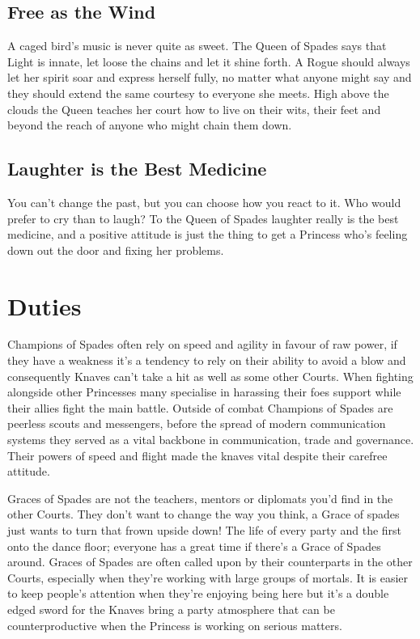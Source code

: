 \subsection*{Free as the Wind}

A caged bird's music is never quite as sweet. The Queen of Spades says that Light is innate, let loose the chains and let it shine forth. A Rogue should always let her spirit soar and express herself fully, no matter what anyone might say and they should extend the same courtesy to everyone she meets. High above the clouds the Queen teaches her court how to live on their wits, their feet and beyond the reach of anyone who might chain them down. 

\subsection*{Laughter is the Best Medicine}

You can't change the past, but you can choose how you react to it. Who would prefer to cry than to laugh? To the Queen of Spades laughter really is the best medicine, and a positive attitude is just the thing to get a Princess who's feeling down out the door and fixing her problems. 

\section*{Duties}

Champions of Spades often rely on speed and agility in favour of raw power, if they have a weakness it's a tendency to rely on their ability to avoid a blow and consequently Knaves can't take a hit as well as some other Courts. When fighting alongside other Princesses many specialise in harassing their foes support while their allies fight the main battle. Outside of combat Champions of Spades are peerless scouts and messengers, before the spread of modern communication systems they served as a vital backbone in communication, trade and governance. Their powers of speed and flight made the knaves vital despite their carefree attitude.

Graces of Spades are not the teachers, mentors or diplomats you'd find in the other Courts. They don't want to change the way you think, a Grace of spades just wants to turn that frown upside down! The life of every party and the first onto the dance floor; everyone has a great time if there's a Grace of Spades around. Graces of Spades are often called upon by their counterparts in the other Courts, especially when they're working with large groups of mortals. It is easier to keep people's attention when they're enjoying being here but it's a double edged sword for the Knaves bring a party atmosphere that can be counterproductive when the Princess is working on serious matters.

